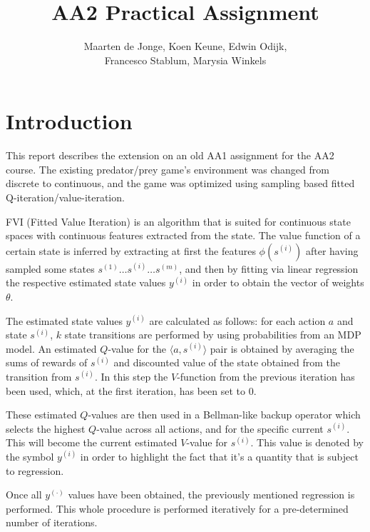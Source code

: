 \documentclass[a4paper, 12pt]{article}
\begin{document}
\title{AA2 Practical Assignment}
\author{Maarten de Jonge, Koen Keune, Edwin Odijk,\\ Francesco Stablum, Marysia Winkels}
\maketitle

\section*{Introduction}
This report describes the extension on an old AA1 assignment for the AA2 course. The existing predator/prey game's environment was changed from discrete to continuous, and the game was optimized using sampling based fitted Q-iteration/value-iteration.%

FVI (Fitted Value Iteration) is an algorithm that is suited for
continuous state spaces with continuous features extracted from
the state. 
The value function of a certain state is inferred by
extracting at first the features $\phi(s^{(i)})$ 
after having sampled some states 
$s^{(1)}\ldots s^{(i)} \ldots s^{(m)}$, 
and then by fitting via linear regression
the respective estimated state values $y^{(i)}$ 
in order to obtain the vector
of weights $\theta$.

The estimated state values $y^{(i)}$ are calculated as follows:
for each action $a$ and state $s^{(i)}$, 
$k$ state transitions are performed by using probabilities from 
an MDP model.
An estimated $Q$-value for the $\langle a,s^{(i)}\rangle$ pair is obtained
by averaging the sums of rewards of $s^{(i)}$ and
discounted value of the
state obtained from the transition from $s^{(i)}$.
In this step the $V$-function from the previous iteration has been used,
which, at the first iteration, has been set to 0.

These estimated $Q$-values are then used in a Bellman-like 
backup operator which selects the highest $Q$-value across all actions,
and for the specific current $s^{(i)}$.
This will become the current estimated $V$-value for $s^{(i)}$. 
This value is denoted
by the symbol $y^{(i)}$ in order to highlight the fact that it's 
a quantity that is subject to regression.

Once all $y^{(\cdot)}$ values have been obtained,
the previously mentioned regression is performed.
This whole procedure is performed iteratively for a pre-determined
number of iterations.
\end{document}
